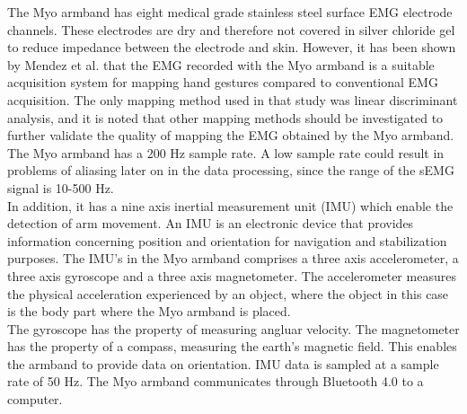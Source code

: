 The Myo armband has eight medical grade stainless steel surface EMG electrode channels. %
These electrodes are dry and therefore not covered in silver chloride gel to reduce impedance between the electrode and skin. However, it has been shown by Mendez et al. \cite{Mendez2017} that the EMG recorded with the Myo armband is a suitable acquisition system for mapping hand gestures compared to conventional EMG acquisition. The only mapping method used in that study was linear discriminant analysis, and it is noted that other mapping methods should be investigated to further validate the quality of mapping the EMG obtained by the Myo armband. The Myo armband has a 200 Hz sample rate. A low sample rate could result in problems of aliasing later on in the data processing, since the range of the sEMG signal is 10-500 Hz. \cite{cram2012} \\
In addition, it has a nine axis inertial measurement unit (IMU) which enable the detection of arm movement. An IMU is an electronic device that provides information concerning position and orientation for navigation and stabilization purposes. The IMU's in the Myo armband comprises a three axis accelerometer, a three axis gyroscope and a three axis magnetometer. The accelerometer measures the physical acceleration experienced by an object, where the object in this case is the body part where the Myo armband is placed. \\
The gyroscope has the property of measuring angluar velocity. The magnetometer has the property of a compass, measuring the earth's magnetic field. This enables the armband to provide data on orientation. IMU data is sampled at a sample rate of 50 Hz. The Myo armband communicates through Bluetooth 4.0 to a computer.



